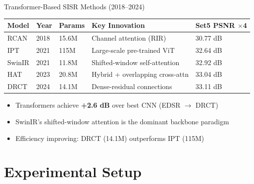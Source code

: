 \documentclass[aspectratio=169]{beamer}
\begin{document}
\begin{frame}{Transformer-Based SISR Methods (2018–2024)}
  \begin{center}
  \small
  \begin{tabular}{@{}lllll@{}}
    \toprule
    \textbf{Model} & \textbf{Year} & \textbf{Params} & \textbf{Key Innovation} & \textbf{Set5 PSNR $\times$4} \\
    \midrule
    RCAN   & 2018 & 15.6M & Channel attention (RIR)          & 30.77 dB \\
    IPT    & 2021 & 115M  & Large-scale pre-trained ViT      & 32.64 dB \\
    SwinIR & 2021 & 11.8M & Shifted-window self-attention    & 32.92 dB \\
    HAT    & 2023 & 20.8M & Hybrid + overlapping cross-attn  & 33.04 dB \\
    DRCT   & 2024 & 14.1M & Dense-residual connections       & 33.11 dB \\
    \bottomrule
  \end{tabular}
  \end{center}
  \vspace{4pt}
  \begin{itemize}
    \item Transformers achieve \textbf{+2.6 dB} over best CNN (EDSR $\to$ DRCT)
    \item SwinIR's shifted-window attention is the dominant backbone paradigm
    \item Efficiency improving: DRCT (14.1M) outperforms IPT (115M)
  \end{itemize}
\end{frame}

\section{Experimental Setup}
\end{document}
